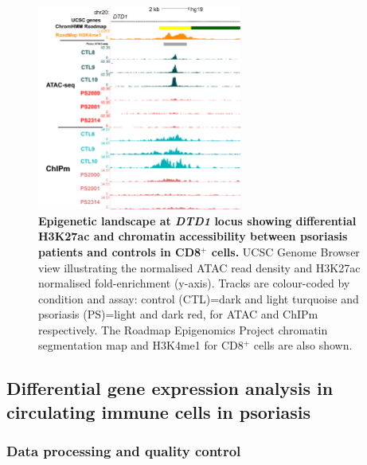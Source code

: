 
\begin{figure}[htb]
\centering
\includegraphics[width=0.6\textwidth]{./Results2/pdfs/ChIPm_H3K27ac_UCSC_CD8_DTD1_track}
\caption[Epigenetic landscape at \textit{DTD1} locus showing differential H3K27ac and chromatin accessibility between psoriasis patients and controls in CD8$^+$ cells.]{\textbf{Epigenetic landscape at \textit{DTD1} locus showing differential H3K27ac and chromatin accessibility between psoriasis patients and controls in CD8$^+$ cells.} UCSC Genome Browser view illustrating the normalised ATAC read density and H3K27ac normalised fold-enrichment (y-axis). Tracks are colour-coded by condition and assay: control (CTL)=dark and light turquoise and psoriasis (PS)=light and dark red, for ATAC and ChIPm respectively. The Roadmap Epigenomics Project chromatin segmentation map and H3K4me1 for CD8$^+$ cells are also shown.}
\label{figure:ATAC_ChIPm_overlap_DTD1_region_track}
\end{figure}




\subsection{Differential gene expression analysis in circulating immune cells in psoriasis}



\subsubsection{Data processing and quality control}

